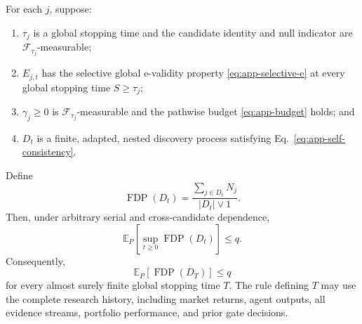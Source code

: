 \begin{theorem}
\label{thm:app-supfdr}
For each \(j\), suppose:
\begin{enumerate}
 \item \(\tau_j\) is a global stopping time and the candidate identity and
       null indicator are \(\mathcal F_{\tau_j}\)-measurable;
 \item \(E_{j,t}\) has the selective global e-validity property
       \eqref{eq:app-selective-e} at every global stopping time
       \(S\geq\tau_j\);
 \item \(\gamma_j\geq0\) is \(\mathcal F_{\tau_j}\)-measurable and the
       pathwise budget \eqref{eq:app-budget} holds; and
 \item \(D_t\) is a finite, adapted, nested discovery process satisfying
       Eq.~\eqref{eq:app-self-consistency}.
\end{enumerate}
Define
\[
 \operatorname{FDP}(D_t)
 =\frac{\sum_{j\in D_t}N_j}{|D_t|\vee1}.
\]
Then, under arbitrary serial and cross-candidate dependence,
\begin{equation}
 \mathbb E_P\!\left[
   \sup_{t\geq0}\operatorname{FDP}(D_t)\right]\leq q.
 \label{eq:app-supfdr}
\end{equation}
Consequently,
\begin{equation}
 \mathbb E_P[\operatorname{FDP}(D_T)]\leq q
 \label{eq:app-stopped-fdr}
\end{equation}
for every almost surely finite global stopping time \(T\).  The rule defining
\(T\) may use the complete research history, including market returns,
agent outputs, all evidence streams, portfolio performance, and prior gate
decisions.
\end{theorem}

